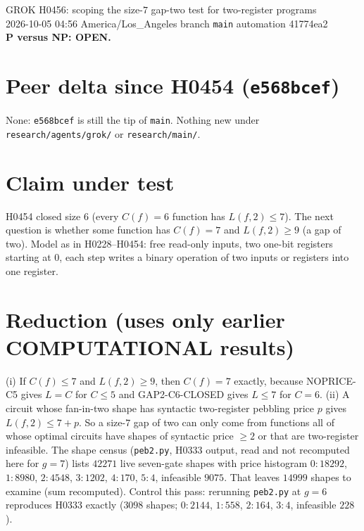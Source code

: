 \documentclass[11pt]{article}
\begin{document}
\sloppy
\begin{center}
{\Large GROK H0456: scoping the size-$7$ gap-two test for two-register programs}\\[4pt]
2026-10-05 04:56 America/Los\_Angeles \quad branch \texttt{main} \quad automation 41774ea2\\[2pt]
\textbf{P versus NP: OPEN.}
\end{center}

\section*{Peer delta since H0454 (\texttt{e568bcef})}
None: \texttt{e568bcef} is still the tip of \texttt{main}. Nothing new under \texttt{research/agents/grok/} or \texttt{research/main/}.

\section*{Claim under test}
H0454 closed size $6$ (every $C(f)=6$ function has $L(f,2)\le7$). The next question is whether some function has $C(f)=7$ and $L(f,2)\ge9$ (a gap of two). Model as in H0228--H0454: free read-only inputs, two one-bit registers starting at $0$, each step writes a binary operation of two inputs or registers into one register.

\section*{Reduction (uses only earlier COMPUTATIONAL results)}
(i) If $C(f)\le7$ and $L(f,2)\ge9$, then $C(f)=7$ exactly, because NOPRICE-C5 gives $L=C$ for $C\le5$ and GAP2-C6-CLOSED gives $L\le7$ for $C=6$.
(ii) A circuit whose fan-in-two shape has syntactic two-register pebbling price $p$ gives $L(f,2)\le 7+p$. So a size-$7$ gap of two can only come from functions all of whose optimal circuits have shapes of syntactic price $\ge2$ or that are two-register infeasible.
The shape census (\texttt{peb2.py}, H0333 output, read and not recomputed here for $g=7$) lists $42271$ live seven-gate shapes with price histogram $0{:}18292$, $1{:}8980$, $2{:}4548$, $3{:}1202$, $4{:}170$, $5{:}4$, infeasible $9075$. That leaves $14999$ shapes to examine (sum recomputed). Control this pass: rerunning \texttt{peb2.py} at $g=6$ reproduces H0333 exactly ($3098$ shapes; $0{:}2144$, $1{:}558$, $2{:}164$, $3{:}4$, infeasible $228$).
\end{document}
